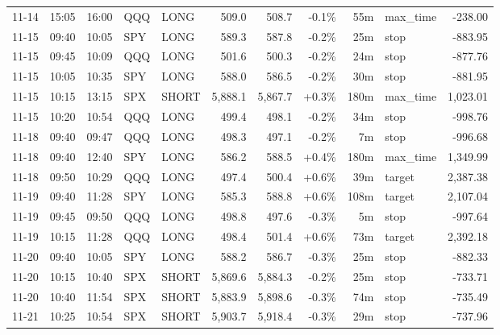 \documentclass[11pt,a4paper,twoside]{article}
\begin{document}
\begin{center}
\begin{longtable}{>{\color{txtmain}}l l l l l r r r r >{\color{txtmain}}l r}
11-14 & 15:05 & 16:00 & QQQ & LONG & 509.0 & 508.7 & \textcolor{lossred}{-0.1\%} & 55m & max\_time & \textcolor{lossred}{-238.00} \\
11-15 & 09:40 & 10:05 & SPY & LONG & 589.3 & 587.8 & \textcolor{lossred}{-0.2\%} & 25m & stop & \textcolor{lossred}{-883.95} \\
11-15 & 09:45 & 10:09 & QQQ & LONG & 501.6 & 500.3 & \textcolor{lossred}{-0.2\%} & 24m & stop & \textcolor{lossred}{-877.76} \\
11-15 & 10:05 & 10:35 & SPY & LONG & 588.0 & 586.5 & \textcolor{lossred}{-0.2\%} & 30m & stop & \textcolor{lossred}{-881.95} \\
11-15 & 10:15 & 13:15 & SPX & SHORT & 5,888.1 & 5,867.7 & \textcolor{wingreen}{+0.3\%} & 180m & max\_time & \textcolor{wingreen}{1,023.01} \\
11-15 & 10:20 & 10:54 & QQQ & LONG & 499.4 & 498.1 & \textcolor{lossred}{-0.2\%} & 34m & stop & \textcolor{lossred}{-998.76} \\
11-18 & 09:40 & 09:47 & QQQ & LONG & 498.3 & 497.1 & \textcolor{lossred}{-0.2\%} & 7m & stop & \textcolor{lossred}{-996.68} \\
11-18 & 09:40 & 12:40 & SPY & LONG & 586.2 & 588.5 & \textcolor{wingreen}{+0.4\%} & 180m & max\_time & \textcolor{wingreen}{1,349.99} \\
11-18 & 09:50 & 10:29 & QQQ & LONG & 497.4 & 500.4 & \textcolor{wingreen}{+0.6\%} & 39m & target & \textcolor{wingreen}{2,387.38} \\
11-19 & 09:40 & 11:28 & SPY & LONG & 585.3 & 588.8 & \textcolor{wingreen}{+0.6\%} & 108m & target & \textcolor{wingreen}{2,107.04} \\
11-19 & 09:45 & 09:50 & QQQ & LONG & 498.8 & 497.6 & \textcolor{lossred}{-0.3\%} & 5m & stop & \textcolor{lossred}{-997.64} \\
11-19 & 10:15 & 11:28 & QQQ & LONG & 498.4 & 501.4 & \textcolor{wingreen}{+0.6\%} & 73m & target & \textcolor{wingreen}{2,392.18} \\
11-20 & 09:40 & 10:05 & SPY & LONG & 588.2 & 586.7 & \textcolor{lossred}{-0.3\%} & 25m & stop & \textcolor{lossred}{-882.33} \\
11-20 & 10:15 & 10:40 & SPX & SHORT & 5,869.6 & 5,884.3 & \textcolor{lossred}{-0.2\%} & 25m & stop & \textcolor{lossred}{-733.71} \\
11-20 & 10:40 & 11:54 & SPX & SHORT & 5,883.9 & 5,898.6 & \textcolor{lossred}{-0.3\%} & 74m & stop & \textcolor{lossred}{-735.49} \\
11-21 & 10:25 & 10:54 & SPX & SHORT & 5,903.7 & 5,918.4 & \textcolor{lossred}{-0.3\%} & 29m & stop & \textcolor{lossred}{-737.96} \\

\end{longtable}
\end{center}
\end{document}
